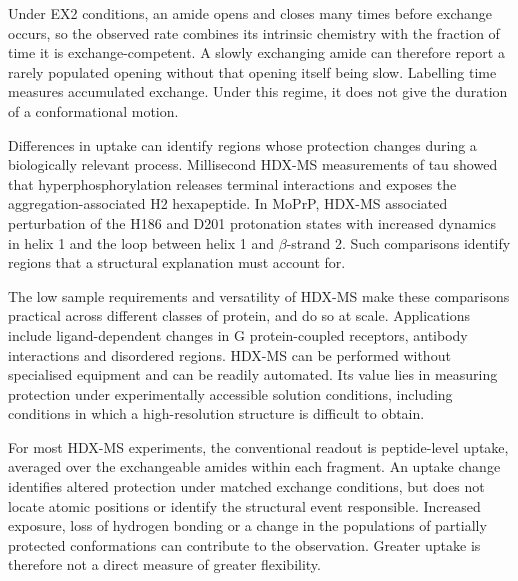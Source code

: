Under EX2 conditions, an amide opens and closes many times before exchange occurs, so the observed rate combines its intrinsic chemistry with the fraction of time it is exchange-competent.\supercite{skinnerProteinHydrogenExchange2012} A slowly exchanging amide can therefore report a rarely populated opening without that opening itself being slow. Labelling time measures accumulated exchange. Under this regime, it does not give the duration of a conformational motion.

Differences in uptake can identify regions whose protection changes during a biologically relevant process. Millisecond HDX-MS measurements of tau showed that hyperphosphorylation releases terminal interactions and exposes the aggregation-associated H2 hexapeptide.\supercite{narangHDXMSAnalyticalTool2020} In MoPrP, HDX-MS associated perturbation of the H186 and D201 protonation states with increased dynamics in helix 1 and the loop between helix 1 and $\beta$-strand 2.\supercite{singhUnravelingMolecularMechanism2016} Such comparisons identify regions that a structural explanation must account for.

The low sample requirements and versatility of HDX-MS make these comparisons practical across different classes of protein, and do so at scale.\supercite{narangHDXMSAnalyticalTool2020} Applications include ligand-dependent changes in G protein-coupled receptors,\supercite{westLigandDependentPerturbationConformational2011} antibody interactions\supercite{andersonHDXMSMDSimulations2022} and disordered regions.\supercite{mitraEmergingRoleMass2021} HDX-MS can be performed without specialised equipment and can be readily automated. Its value lies in measuring protection under experimentally accessible solution conditions, including conditions in which a high-resolution structure is difficult to obtain.

For most HDX-MS experiments, the conventional readout is peptide-level uptake, averaged over the exchangeable amides within each fragment.\supercite{leeInterpretingHydrogenDeuteriumExchange2021} An uptake change identifies altered protection under matched exchange conditions, but does not locate atomic positions or identify the structural event responsible.\supercite{massonRecommendationsPerformingInterpreting2019} Increased exposure, loss of hydrogen bonding or a change in the populations of partially protected conformations can contribute to the observation. Greater uptake is therefore not a direct measure of greater flexibility.

